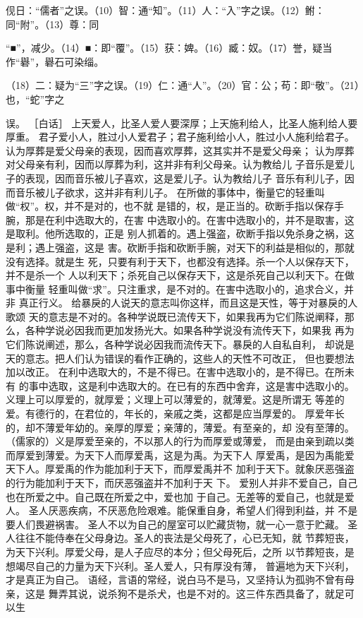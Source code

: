 \documentclass[12pt,UTF8]{ctexbook}
\begin{document}
伣日：“儒者”之误。（10）智：通“知”。（11）人：“入”字之误。（12）鲋：同“附”。（13）尊：同 

“■”，减少。（14）■：即“覆”。（15）获：婢。（16）臧：奴。（17）誉，疑当作“礜”，礜石可染缁。 

（18）二：疑为“三”字之误。（19）仁：通“人”。（20）官：公；苟：即“敬”。（21）也，“蛇”字之 

误。 
［白话］ 
上天爱人，比圣人爱人要深厚；上天施利给人，比圣人施利给人要厚重。 
君子爱小人，胜过小人爱君子；君子施利给小人，胜过小人施利给君子。 
认为厚葬是爱父母亲的表现，因而喜欢厚葬，这其实并不是爱父母亲； 
认为厚葬对父母亲有利，因而以厚葬为利，这并非有利父母亲。认为教给儿 
子音乐是爱儿子的表现，因而音乐被儿子喜欢，这是爱儿子。认为教给儿子 
音乐有利儿子，因而音乐被儿子欲求，这并非有利儿子。 
在所做的事体中，衡量它的轻重叫做“权”。权，并不是对的，也不就 
是错的，权，是正当的。砍断手指以保存手腕，那是在利中选取大的，在害 
中选取小的。在害中选取小的，并不是取害，这是取利。他所选取的，正是 
别人抓着的。遇上强盗，砍断手指以免杀身之祸，这是利；遇上强盗，这是 
害。砍断手指和砍断手腕，对天下的利益是相似的，那就没有选择。就是生 
死，只要有利于天下，也都没有选择。杀一个人以保存天下，并不是杀一个 
人以利天下；杀死自己以保存天下，这是杀死自己以利天下。在做事中衡量 
轻重叫做“求”。只注重求，是不对的。在害中选取小的，追求合义，并非 
真正行义。 
给暴戾的人说天的意志叫你这样，而且这是天性，等于对暴戾的人歌颂 
天的意志是不对的。各种学说既已流传天下，如果我再为它们陈说阐释，那 
么，各种学说必因我而更加发扬光大。如果各种学说没有流传天下，如果我 
再为它们陈说阐述，那么，各种学说必因我而流传天下。暴戾的人自私自利， 
却说是天的意志。把人们认为错误的看作正确的，这些人的天性不可改正， 
但也要想法加以改正。 
在利中选取大的，不是不得已。在害中选取小的，是不得已。在所未有 
的事中选取，这是利中选取大的。在已有的东西中舍弃，这是害中选取小的。 
义理上可以厚爱的，就厚爱；义理上可以薄爱的，就薄爱。这是所谓无 
等差的爱。有德行的，在君位的，年长的，亲戚之类，这都是应当厚爱的。 
厚爱年长的，却不薄爱年幼的。亲厚的厚爱；亲薄的，薄爱。有至亲的，却 
没有至薄的。（儒家的）义是厚爱至亲的，不以那人的行为而厚爱或薄爱， 
而是由亲到疏以类而厚爱到薄爱。为天下人而厚爱禹，这是为禹。为天下人 
厚爱禹，是因为禹能爱天下人。厚爱禹的作为能加利于天下，而厚爱禹并不 
加利于天下。就象厌恶强盗的行为能加利于天下，而厌恶强盗并不加利于天 
下。 
爱别人并非不爱自己，自己也在所爱之中。自己既在所爱之中，爱也加 
于自己。无差等的爱自己，也就是爱人。 
圣人厌恶疾病，不厌恶危险艰难。能保重自身，希望人们得到利益，并 
不是要人们畏避祸害。 
圣人不以为自己的屋室可以贮藏货物，就一心一意于贮藏。 
圣人往往不能侍奉在父母身边。圣人的丧法是父母死了，心已无知，就 
节葬短丧，为天下兴利。厚爱父母，是人子应尽的本分；但父母死后，之所 
以节葬短丧，是想竭尽自己的力量为天下兴利。圣人爱人，只有厚没有薄， 
普遍地为天下兴利，才是真正为自己。 
语经，言语的常经，说白马不是马，又坚持认为孤驹不曾有母亲，这是 
舞弄其说，说杀狗不是杀犬，也是不对的。这三件东西具备了，就足可以生 
\end{document}
